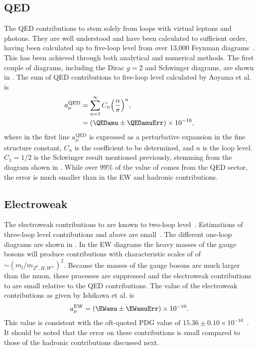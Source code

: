 \subsection{QED}
\label{subsec:QED}

The QED contributions to \amu stem solely from loops with virtual leptons and photons. They are well understood and have been calculated to sufficient order, having been calculated up to five-loop level from over 13,000 Feynman diagrams~\cite{Kinoshita1,Kinoshita2}. This has been achieved through both analytical and numerical methods. The first couple of diagrams, including the Dirac $g = 2$ and Schwinger diagrams, are shown in . The sum of QED contributions to five-loop level calculated by Aoyama et al. is~\cite{Kinoshita1,Kinoshita2}
		\begin{equation}
		\begin{aligned}
            a_{\mu}^{\text{QED}} &= \sum_{n=1}^{\infty} C_{n} \Big( \frac{\alpha}{\pi} \Big)^{n}, \\
            					 &= (\QEDamu \pm \QEDamuErr) \times 10^{-10},
		\end{aligned}
		\end{equation}
where in the first line $a_{\mu}^{\text{QED}}$ is expressed as a perturbative expansion in the fine structure constant, $C_{n}$ is the coefficient to be determined, and $n$ is the loop level. $C_{1} = 1/2$ is the Schwinger result mentioned previously, stemming from the diagram shown in . While over 99\% of the value of \amu comes from the QED sector, the error is much smaller than in the EW and hadronic contributions.



\subsection{Electroweak}
\label{subsec:Electroweak}

The electroweak contributions to \amu are known to two-loop level~\cite{Ishikawa:2018rlv}. Estimations of three-loop level contributions and above are small~\cite{EW1}. The different one-loop diagrams are shown in . In the EW diagrams the heavy masses of the gauge bosons will produce contributions with characteristic scales of of $\sim(m_{l}/m_{Z^{0},H,W^{\pm}})^{2}$. Because the masses of the gauge bosons are much larger than the muon, these processes are suppressed and the electroweak contributions to \amu are small relative to the QED contributions. The value of the electroweak contributions as given by Ishikawa et al. is~\cite{Ishikawa:2018rlv}
		\begin{align}
            a_{\mu}^{\text{EW}} = (\EWamu \pm \EWamuErr) \times 10^{-10}.
		\end{align}
This value is consistent with the oft-quoted PDG value of $15.36 \pm 0.10 \times 10^{-10}$~\cite{EW1}. It should be noted that the error on these contributions is small compared to those of the hadronic contributions discussed next.

